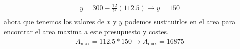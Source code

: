 \documentclass[11pt,a4paper]{article}
\begin{document}
\begin{flushleft}
    \begin{equation*}
        \begin{aligned}
            y = 300 - \frac{12}{9}(112.5) \to y = 150  \\
        \end{aligned}
    \end{equation*}
    ahora que tenemos los valores de $x$ y $y$ podemos sustituirlos en el area para encontrar el area maxima a este presupuesto y costes.
    \begin{equation*}
        \begin{aligned}
            A_{\max} = 112.5*150 \to A_{\max} = 16875 \\
        \end{aligned}
    \end{equation*}
    

\end{flushleft}
\end{document}
